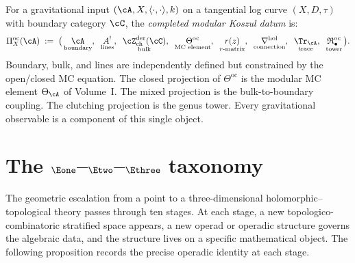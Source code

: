 \begin{definition}
\label{def:completed-platonic-v2}
For a gravitational input $(\cA, X, \langle\cdot,\cdot\rangle, k)$
on a tangential log curve $(X, D, \tau)$ with boundary category
$\cC$, the \emph{completed modular Koszul datum} is:
\[
 \Pi^{\mathrm{oc}}_X(\cA)
 \;:=\;
 \bigl(\,
 \underset{\text{boundary}}{\cA},\;\;
 \underset{\text{lines}}{A^!},\;\;
 \underset{\text{bulk}}{\cZ^{\mathrm{der}}_{\mathrm{ch}}(\cC)},\;\;
 \underset{\text{MC element}}{\Theta^{\mathrm{oc}}},\;\;
 \underset{\text{$r$-matrix}}{r(z)},\;\;
 \underset{\text{connection}}{\nabla^{\mathrm{hol}}},\;\;
 \underset{\text{trace}}{\Tr_\cA},\;\;
 \underset{\text{tower}}{\mathfrak{R}^{\mathrm{oc}}_\bullet}
 \,\bigr).
\]
Boundary, bulk, and lines are independently defined but constrained
by the open/closed MC equation. The closed projection of
$\Theta^{\mathrm{oc}}$ is the modular MC element $\Theta_\cA$ of
Volume~I. The mixed projection is the bulk-to-boundary coupling.
The clutching projection is the genus tower. Every gravitational
observable is a component of this single object.
\end{definition}

\section{The $\Eone$--$\Etwo$--$\Ethree$ taxonomy}
\label{sec:en-taxonomy}

The geometric escalation from a point to a three-dimensional
holomorphic--topological theory passes through ten stages. At each
stage, a new topologico-combinatoric stratified space appears, a
new operad or operadic structure governs the algebraic data, and
the structure lives on a specific mathematical object. The
following proposition records the precise operadic identity at
each stage.

